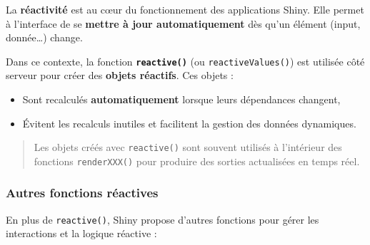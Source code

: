 \documentclass[
]{article}
\newenvironment{Shaded}{\begin{snugshade}}{\end{snugshade}}
\newcommand{\CommentTok}[1]{\textcolor[rgb]{0.56,0.35,0.01}{\textit{#1}}}
\newcommand{\ControlFlowTok}[1]{\textcolor[rgb]{0.13,0.29,0.53}{\textbf{#1}}}
\newcommand{\FunctionTok}[1]{\textcolor[rgb]{0.13,0.29,0.53}{\textbf{#1}}}
\newcommand{\NormalTok}[1]{#1}
\newcommand{\OtherTok}[1]{\textcolor[rgb]{0.56,0.35,0.01}{#1}}
\newcommand{\SpecialCharTok}[1]{\textcolor[rgb]{0.81,0.36,0.00}{\textbf{#1}}}
\providecommand{\tightlist}{%
  \setlength{\itemsep}{0pt}\setlength{\parskip}{0pt}}
\begin{document}
La \textbf{réactivité} est au cœur du fonctionnement des applications
Shiny. Elle permet à l'interface de se \textbf{mettre à jour
automatiquement} dès qu'un élément (input, donnée\ldots) change.

Dans ce contexte, la fonction \textbf{\texttt{reactive()}} (ou
\texttt{reactiveValues()}) est utilisée côté serveur pour créer des
\textbf{objets réactifs}. Ces objets :

\begin{itemize}
\tightlist
\item
  Sont recalculés \textbf{automatiquement} lorsque leurs dépendances
  changent,\\
\item
  Évitent les recalculs inutiles et facilitent la gestion des données
  dynamiques.
\end{itemize}

\begin{quote}
Les objets créés avec \texttt{reactive()} sont souvent utilisés à
l'intérieur des fonctions \texttt{renderXXX()} pour produire des sorties
actualisées en temps réel.
\end{quote}

\begin{Shaded}
\end{Shaded}

\subsubsection{Autres fonctions
réactives}\label{autres-fonctions-ruxe9actives}

En plus de \texttt{reactive()}, Shiny propose d'autres fonctions pour
gérer les interactions et la logique réactive :
\end{document}
